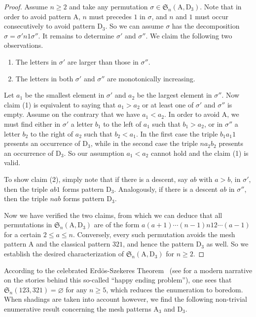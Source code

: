 \documentclass[12pt,reqno]{article}
\numberwithin{equation}{section}
\theoremstyle{plain}
\theoremstyle{definition}
\def\fS{\mathfrak{S}}
\def\rA{\mathrm{A}}
\def\rD{\mathrm{D}}
\begin{document}
\begin{proof}
	Assume $n\geq 2$ and take any permutation $\sigma\in \fS_n(\rA, \rD_3)$. Note that in order to avoid pattern $\rA$, $n$ must precedes $1$ in $\sigma$, and $n$ and $1$ must occur consecutively to avoid pattern $\rD_3$. So we can assume $\sigma$ has the decomposition $\sigma=\sigma' n1 \sigma''$. It remains to determine $\sigma'$ and $\sigma''$. We claim the following two observations.
	\begin{enumerate}
		\item The letters in $\sigma'$ are larger than those in $\sigma''$.
		\item The letters in both $\sigma'$ and $\sigma''$ are monotonically increasing.
	\end{enumerate}

	Let $a_1$ be the smallest element in $\sigma'$ and $a_2$ be the largest element in $\sigma''$. Now claim (1) is equivalent to saying that $a_1>a_2$ or at least one of $\sigma'$ and $\sigma''$ is empty. Assume on the contrary that we have $a_1<a_2$. In order to avoid $\rA$, we must find either in $\sigma'$ a letter $b_1$ to the left of $a_1$ such that $b_1>a_2$, or in $\sigma''$ a letter $b_2$ to the right of $a_2$ such that $b_2<a_1$. In the first case the triple $b_1a_1 1$ presents an occurrence of $\rD_3$, while in the second case the triple $na_2b_2$ presents an occurrence of $\rD_3$. So our assumption $a_1<a_2$ cannot hold and the claim (1) is valid.

	To show claim (2), simply note that if there is a descent, say $ab$ with $a>b$, in $\sigma'$, then the triple $ab1$ forms pattern $\rD_3$. Analogously, if there is a descent $ab$ in $\sigma''$, then the triple $nab$ forms pattern $\rD_3$.
	
	Now we have verified the two claims, from which we can deduce that all permutations in $\fS_n(\rA,\rD_3)$ are of the form $a(a+1)\cdots (n-1)n12\cdots (a-1)$ for a certain $2\le a\le n$. Conversely, every such permutation avoids the mesh pattern $\rA$ and the classical pattern $321$, and hence the pattern $\rD_3$ as well. So we establish the desired characterization of $\fS_n(\rA,\rD_3)$ for $n\ge 2$.
\end{proof}

According to the celebrated Erd\"os-Szekeres Theorem~\cite{ES35} (see \cite{Jun24} for a modern narrative on the stories behind this so-called ``happy ending problem''), one sees that $\fS_n(123,321)=\varnothing$ for any $n\ge 5$, which reduces the enumeration to boredom. When shadings are taken into account however, we find the following non-trivial enumerative result concerning the mesh patterns $\rA_3$ and $\rD_3$.
\end{document}
